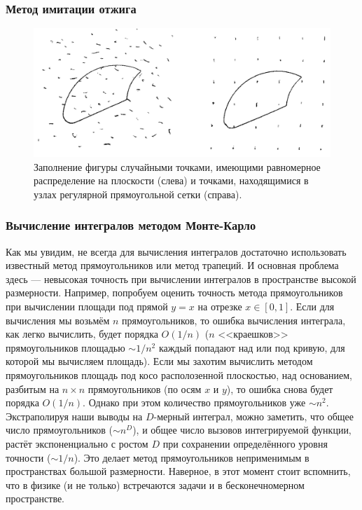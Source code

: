 \documentclass{book}
\begin{document}
\subsubsection{Метод имитации отжига}

\begin{figure}
	\includegraphics[width=1\linewidth]{dots-for-monte-carlo.png}
    \caption{\label{dots-for-monte-carlo}Заполнение фигуры случайными точками, имеющими равномерное
    распределение на плоскости (слева) и точками, находящимися в узлах регулярной прямоугольной
    сетки (справа).}
\end{figure}

\subsubsection{Вычисление интегралов методом Монте-Карло}

Как мы увидим, не всегда для вычисления интегралов достаточно использовать известный метод
прямоугольников или метод трапеций. И основная проблема здесь --- невысокая точность при вычислении
интегралов в пространстве высокой размерности. Например, попробуем оценить точность метода
прямоугольников при вычислении площади под прямой $y = x$ на отрезке $x \in [0, 1]$. Если для
вычисления мы возьмём $n$ прямоугольников, то ошибка вычисления интеграла, как легко вычислить,
будет порядка $O(1/n)$ ($n$ <<краешков>> прямоугольников площадью $\sim 1/n^2$ каждый попадают над
или под кривую, для которой мы вычисляем площадь). Если мы захотим вычислить методом
прямоугольников площадь под косо располозенной плоскостью, над основанием, разбитым на $n \times n$
прямоугольников (по осям $x$ и $y$), то ошибка снова будет порядка $O(1/n)$. Однако при этом
количество прямоугольников уже $\sim n^2$. Экстраполируя наши выводы на $D$-мерный интеграл, можно
заметить, что общее число прямоугольников ($\sim n^D$), и общее число вызовов интегрируемой
функции, растёт экспоненциально с ростом $D$ при сохранении определённого уровня точности ($\sim
1/n$). Это делает метод прямоугольников неприменимым в пространствах большой размерности. Наверное,
в этот момент стоит вспомнить, что в физике (и не только) встречаются задачи и в бесконечномерном
пространстве.
\end{document}
